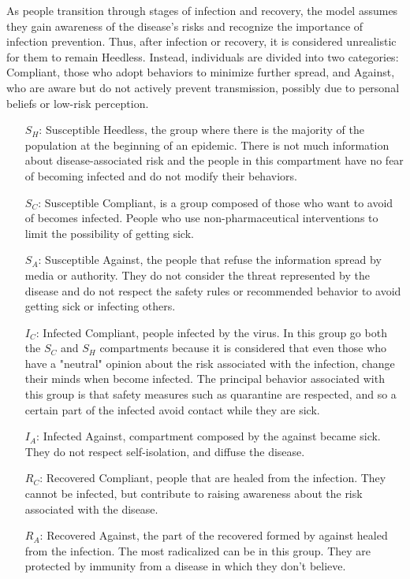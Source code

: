 As people transition through stages of infection and recovery, the model assumes they gain awareness of the disease's risks and recognize the importance of infection prevention. Thus, after infection or recovery, it is considered unrealistic for them to remain Heedless. Instead, individuals are divided into two categories: Compliant, those who adopt behaviors to minimize further spread, and Against, who are aware but do not actively prevent transmission, possibly due to personal beliefs or low-risk perception. 

\begin{itemize}
	\item[$S_H$:] Susceptible Heedless, the group where there is the majority of the population at the beginning of an epidemic. There is not much information about disease-associated risk and the people in this compartment have no fear of becoming infected and do not modify their behaviors.
	\item[$S_C$:] Susceptible Compliant, is a group composed of those who want to avoid of becomes infected. People who use non-pharmaceutical interventions to limit the possibility of getting sick.
	\item[$S_A$:] Susceptible Against, the people that refuse the information spread by media or authority. They do not consider the threat represented by the disease and do not respect the safety rules or recommended behavior to avoid getting sick or infecting others. 
	\item[$I_C$:] Infected Compliant, people infected by the virus. In this group go both the $S_C$ and $S_H$ compartments because it is considered that even those who have a "neutral" opinion about the risk associated with the infection, change their minds when become infected. The principal behavior associated with this group is that safety measures such as quarantine are respected, and so a certain part of the infected avoid contact while they are sick.
	\item[$I_A$:] Infected Against, compartment composed by the against became sick. They do not respect self-isolation, and diffuse the disease. 
	\item[$R_C$:] Recovered Compliant, people that are healed from the infection. They cannot be infected, but contribute to raising awareness about the risk associated with the disease. 
	\item[$R_A$:] Recovered Against, the part of the recovered formed by against healed from the infection. The most radicalized can be in this group. They are protected by immunity from a disease in which they don't believe. 
\end{itemize}

